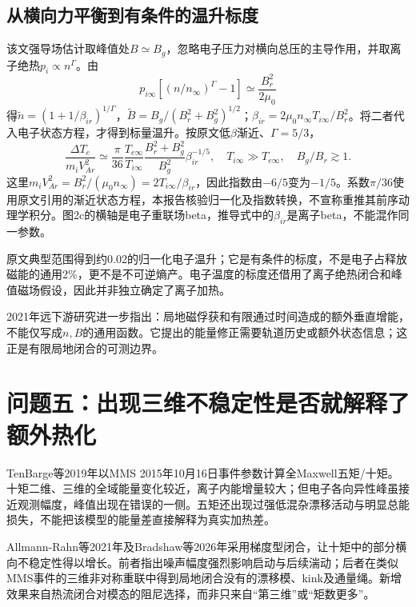 \subsection{从横向力平衡到有条件的温升标度}
该文强导场估计取峰值处$B\simeq B_g$，忽略电子压力对横向总压的主导作用，并取离子绝热$p_i\propto n^\Gamma$。由
\begin{equation}
p_{i\infty}\left[(n/n_\infty)^\Gamma-1\right]\simeq\frac{B_r^2}{2\mu_0}
\end{equation}
得$\widetilde n=(1+1/\beta_{ir})^{1/\Gamma}$，$\widetilde B=B_g/(B_r^2+B_g^2)^{1/2}$；$\beta_{ir}=2\mu_0n_\infty T_{i\infty}/B_r^2$。将二者代入电子状态方程，才得到标量温升。按原文低$\beta$渐近、$\Gamma=5/3$，
\begin{equation}
\frac{\Delta T_e}{m_iV_{Ar}^2}\simeq\frac{\pi}{36}\frac{T_{e\infty}}{T_{i\infty}}
\frac{B_r^2+B_g^2}{B_g^2}\beta_{ir}^{-1/5},
\quad T_{i\infty}\gg T_{e\infty},\quad B_g/B_r\gtrsim1.
\end{equation}
这里$m_iV_{Ar}^2=B_r^2/(\mu_0n_\infty)=2T_{i\infty}/\beta_{ir}$，因此指数由$-6/5$变为$-1/5$。系数$\pi/36$使用原文引用的渐近状态方程，本报告核验归一化及指数转换，不宣称重推其前序动理学积分。图2c的横轴是电子重联场beta，推导式中的$\beta_{ir}$是离子beta，不能混作同一参数。

原文典型范围得到约0.02的归一化电子温升；它是有条件的标度，不是电子占释放磁能的通用2\%，更不是不可逆熵产。电子温度的标度还借用了离子绝热闭合和峰值磁场假设，因此并非独立确定了离子加热。

2021年远下游研究进一步指出：局地磁俘获和有限通过时间造成的额外垂直增能，不能仅写成$n,B$的通用函数。它提出的能量修正需要轨道历史或额外状态信息；这正是有限局地闭合的可测边界。\citep{Wetherton2021}

\section{问题五：出现三维不稳定性是否就解释了额外热化}
TenBarge等2019年以MMS 2015年10月16日事件参数计算全Maxwell五矩/十矩。十矩二维、三维的全域能量变化较近，离子内能增量较大；但电子各向异性峰虽接近观测幅度，峰值出现在错误的一侧。五矩还出现过强低混杂漂移活动与明显总能损失，不能把该模型的能量差直接解释为真实加热差。\citep{TenBarge2019MMS}

Allmann-Rahn等2021年及Bradshaw等2026年采用梯度型闭合，让十矩中的部分横向不稳定性得以增长。前者指出噪声幅度强烈影响启动与后续湍动；后者在类似MMS事件的三维非对称重联中得到局地闭合没有的漂移模、kink及通量绳。新增效果来自热流闭合对模态的阻尼选择，而非只来自“第三维”或“矩数更多”。\citep{E552,Closure2026}

